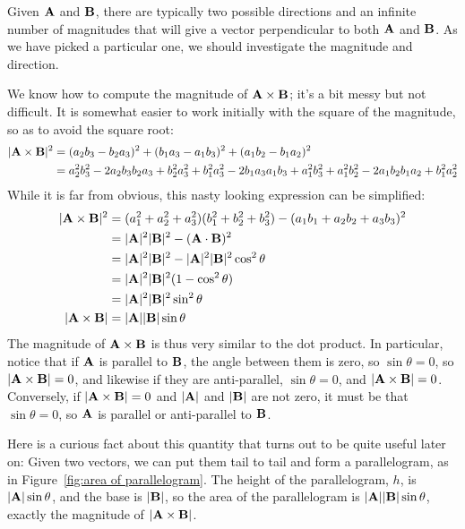 Given $\bf A$ and $\bf B$, there are typically two possible directions and an
infinite number of magnitudes that will give a vector perpendicular to
both $\bf A$ and $\bf B$. As we have picked a particular one, we
should investigate the magnitude and direction.

We know how to compute the magnitude of ${\bf A}\times{\bf B}$; it's a
bit messy but not difficult. It is somewhat easier to work initially
with the square of the magnitude, so as to avoid the square root:
\begin{align*}
  |{\bf A}\times{\bf B}|^2&=
  (a_2b_3-b_2a_3)^2+(b_1a_3-a_1b_3)^2+(a_1b_2-b_1a_2)^2	\\
  &=a_2^2b_3^2-2a_2b_3b_2a_3+b_2^2a_3^2+b_1^2a_3^2-2b_1a_3a_1b_3+a_1^2b_3^2+a_1^2b_2^2-2a_1b_2b_1a_2+b_1^2a_2^2
\end{align*}
While it is far from obvious, this nasty looking expression can be
simplified: 
\begin{align*}
  |{\bf A}\times{\bf B}|^2&=
  (a_1^2+a_2^2+a_3^2)(b_1^2+b_2^2+b_3^2)-(a_1b_1+a_2b_2+a_3b_3)^2	\\
  &=|{\bf A}|^2|{\bf B}|^2-({\bf A}\cdot{\bf B})^2	\\
  &=|{\bf A}|^2|{\bf B}|^2-|{\bf A}|^2|{\bf B}|^2\cos^2\theta	\\
  &=|{\bf A}|^2|{\bf B}|^2(1-\cos^2\theta)	\\
  &=|{\bf A}|^2|{\bf B}|^2\sin^2\theta	\\
  |{\bf A}\times{\bf B}|&=|{\bf A}||{\bf B}|\sin\theta
\end{align*}
The magnitude of ${\bf A}\times{\bf B}$ is thus very similar to the dot
product. In particular, notice that if $\bf A$ is parallel to $\bf B$,
the angle between them is zero, so $\sin\theta=0$, so 
$|{\bf A}\times{\bf B}|=0$, and likewise if they are anti-parallel, 
$\sin\theta=0$, and
$|{\bf A}\times{\bf B}|=0$. Conversely, if $|{\bf A}\times{\bf B}|=0$
and $|{\bf A}|$ and $|{\bf B}|$ are not zero, it must be that
$\sin\theta=0$, so $\bf A$ is parallel or anti-parallel to $\bf B$. 

\label{page:parallelogram area} Here is a curious fact about this
quantity that turns out to be quite useful later on: Given two
vectors, we can put them tail to tail and form a
parallelogram, as in Figure~\ref{fig:area of parallelogram}. The
height of the parallelogram, $h$, is $|{\bf A}|\sin\theta$, and the
base is $|{\bf B}|$, so the area of the
parallelogram is $|{\bf A}||{\bf
B}|\sin\theta$, exactly the magnitude of $|{\bf A}\times{\bf B}|$.


